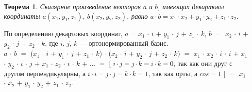 \newtheorem*{th2_4}{Теорема}\begin{th2_4} Скалярное произведение векторов $a$ и $b$, имеющих декартовы координаты $a(x_1, y_1, z_1)$, $b(x_2, y_2, z_2)$, равно $a\cdot b = x_1\cdot x_2 + y_1\cdot y_2 + z_1 \cdot z_2$.
\end{th2_4}
\begin{Proof}
	По определению декартовых координат, $a$ = $x_1$ $\cdot$ $i$ $+$ $y_1$ $\cdot$ $j$ $+$ $z_1$ $\cdot$ $k$, $b$ $=$ $x_2$ $\cdot$ $i$ $+$ $y_2$ $\cdot$ $j$ $+$ $z_2$ $\cdot$ $k$,
	где $i$, $j$, $k$ --- ортонормированный базис.
	\\ $a$ $\cdot$ $b$ $=$ ($x_1$ $\cdot$ $i$ $+$ $y_1$ $\cdot$ $j$ $+$ $z_1$ $\cdot$ $k$) $\cdot$ ($x_2$ $\cdot$ $i$ $+$ $y_2$ $\cdot$ $j$ $+$ $z_2$ $\cdot$ $k$) $=$ $x_1$ $\cdot$ $x_2$ $\cdot$ $i$ $\cdot$ $i$ $+$ $x_1$ $\cdot$ $y_2$ $\cdot$ $i$ $\cdot$ $j$ $+$ $x_1$ $\cdot$ $z_2$ $\cdot$ $i$ $\cdot$ $k$ $+$ $\dots$ $=$ $[$ $i\cdot j = j\cdot k = i\cdot k = 0$, так как они друг с другом
	перпендикулярны, а $i\cdot i = j\cdot j = k\cdot k = 1$, так как орты, а $cos = 1$ $]$ $=$
	$x_1$ $\cdot$ $x_2$ $+$ $y_1$ $\cdot$ $y_2$ $+$ $z_1$ $\cdot$ $z_2$.
\end{Proof}








